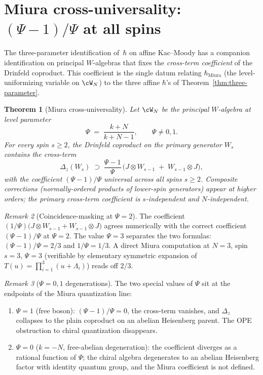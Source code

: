 \documentclass[11pt]{article}
\theoremstyle{plain}
\newtheorem{theorem}{Theorem}[section]
\theoremstyle{definition}
\theoremstyle{remark}
\newtheorem{remark}[theorem]{Remark}
\numberwithin{equation}{section}
\begin{document}
\section{Miura cross-universality: $(\Psi{-}1)/\Psi$ at all spins}
\label{sec:miura-3hbar}

The three-parameter identification of~$\hbar$ on affine Kac--Moody
has a companion identification on principal $W$-algebras that fixes
the \emph{cross-term coefficient} of the Drinfeld coproduct. This
coefficient is the single datum relating $\hbar_{\mathrm{Miura}}$
(the level-uniformizing variable on $\cW_N$) to the three affine
$\hbar$'s of Theorem~\ref{thm:three-parameter}.

\begin{theorem}[Miura cross-universality]\label{thm:miura-cross-universality-3hbar}
Let $\cW_N$ be the principal $W$-algebra at level parameter
\[
 \Psi \;=\; \frac{k + N}{k + N - 1}, \qquad \Psi \neq 0, 1.
\]
For every spin $s \geq 2$, the Drinfeld coproduct on the primary
generator $W_s$ contains the cross-term
\[
 \Delta_z(W_s) \;\supset\;
 \frac{\Psi - 1}{\Psi}\,\bigl(J \otimes W_{s-1}
 \;+\; W_{s-1}\otimes J\bigr),
\]
with the coefficient $(\Psi-1)/\Psi$ \emph{universal across all spins
$s \geq 2$}. Composite corrections (normally-ordered products of
lower-spin generators) appear at higher orders; the primary
cross-term coefficient is $s$-independent and $N$-independent.
\end{theorem}

\begin{remark}[Coincidence-masking at $\Psi = 2$]
\label{rem:miura-coefficient-coincidence-3hbar}
The coefficient $(1/\Psi)\bigl(J \otimes W_{s-1}
+ W_{s-1}\otimes J\bigr)$ agrees numerically with the correct
coefficient $(\Psi-1)/\Psi$ at $\Psi=2$. The value $\Psi=3$
separates the two formulas: $(\Psi-1)/\Psi=2/3$ and $1/\Psi=1/3$.
A direct Miura computation at $N = 3$, spin $s = 3$,
$\Psi = 3$ (verifiable by elementary symmetric expansion of
$T(u) = \prod_{i=1}^3 (u + \Lambda_i)$) reads off $2/3$.
\end{remark}

\begin{remark}[$\Psi = 0, 1$ degenerations]
\label{rem:psi-degenerations-3hbar}
The two special values of $\Psi$ sit at the endpoints of the Miura
quantization line:
\begin{enumerate}[label=(\roman*)]
 \item $\Psi = 1$ (free boson): $(\Psi-1)/\Psi = 0$, the cross-term
 vanishes, and $\Delta_z$ collapses to the plain coproduct on an
 abelian Heisenberg parent. The OPE obstruction to chiral
 quantization disappears.
 \item $\Psi = 0$ ($k = -N$, free-abelian degeneration): the
 coefficient diverges as a rational function of $\Psi$; the chiral
 algebra degenerates to an abelian Heisenberg factor with identity
 quantum group, and the Miura coefficient is not defined.
\end{enumerate}
\end{remark}
\end{document}
